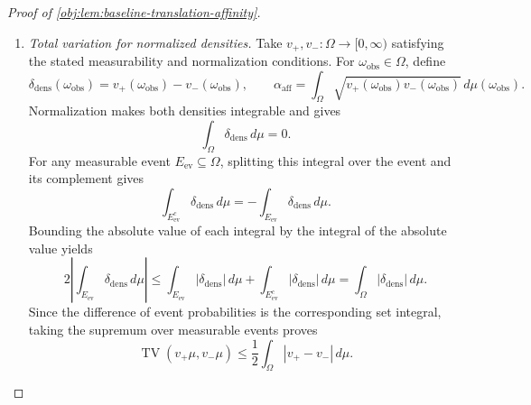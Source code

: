 \begin{proof}[Proof of \cref{obj:lem:baseline-translation-affinity}]
\begin{enumerate}
For completeness, the product-defect bound follows by induction over subsets
\(\mathcal J\subseteq\{1,\ldots,B\}\). Every such product lies in \([0,1]\), and the empty subset gives equality. For
\(\ell_0\in\{1,\ldots,B\}\setminus\mathcal J\), the induction step is
\[
\begin{aligned}
1-\alpha_{\mathrm{aff},\ell_0}
      \prod_{\ell\in\mathcal J}\alpha_{\mathrm{aff},\ell}
&=(1-\alpha_{\mathrm{aff},\ell_0})
  +\alpha_{\mathrm{aff},\ell_0}
     \left(1-\prod_{\ell\in\mathcal J}\alpha_{\mathrm{aff},\ell}\right)\\
&\le (1-\alpha_{\mathrm{aff},\ell_0})
     +1-\prod_{\ell\in\mathcal J}\alpha_{\mathrm{aff},\ell}\\
&\le (1-\alpha_{\mathrm{aff},\ell_0})
     +\sum_{\ell\in\mathcal J}(1-\alpha_{\mathrm{aff},\ell}).
\end{aligned}
\]
Consequently,
\[
\begin{aligned}
\int_{\mathbb R^B}
\left(\sqrt{v_{\boldsymbol s}(y)}
      -\sqrt{v_{\boldsymbol t}(y)}\right)^2\,dy
&\le\sum_{\ell=1}^B\mathcal E_{\mathrm{Hel},\ell}\\
&\le\sum_{\ell=1}^B4\pi^2(s_\ell-t_\ell)^2,
\end{aligned}
\]
where the last inequality is the scalar translation estimate. When \(B=0\), both product densities equal \(1\) on the one-point space \(\mathbb R^0\), and both sides of the bound are zero.

\item \emph{Total variation for normalized densities.}
Take \(v_+,v_-:\Omega\to[0,\infty)\) satisfying the stated measurability and normalization conditions. For \(\omega_{\mathrm{obs}}\in\Omega\), define
\[
\delta_{\mathrm{dens}}(\omega_{\mathrm{obs}})=v_+(\omega_{\mathrm{obs}})-v_-(\omega_{\mathrm{obs}}),
\qquad
\alpha_{\mathrm{aff}}
=\int_\Omega\sqrt{v_+(\omega_{\mathrm{obs}})v_-(\omega_{\mathrm{obs}})}\,d\mu(\omega_{\mathrm{obs}}).
\]
Normalization makes both densities integrable and gives
\[
\int_\Omega\delta_{\mathrm{dens}}\,d\mu=0.
\]
For any measurable event \(E_{\mathrm{ev}}\subseteq\Omega\), splitting this integral over the event and its complement gives
\[
\int_{E_{\mathrm{ev}}^c}\delta_{\mathrm{dens}}\,d\mu
=-\int_{E_{\mathrm{ev}}}\delta_{\mathrm{dens}}\,d\mu.
\]
Bounding the absolute value of each integral by the integral of the absolute value yields
\[
2\left|\int_{E_{\mathrm{ev}}}\delta_{\mathrm{dens}}\,d\mu\right|
\le
\int_{E_{\mathrm{ev}}}|\delta_{\mathrm{dens}}|\,d\mu
+\int_{E_{\mathrm{ev}}^c}|\delta_{\mathrm{dens}}|\,d\mu
=\int_\Omega|\delta_{\mathrm{dens}}|\,d\mu.
\]
Since the difference of event probabilities is the corresponding set integral, taking the supremum over measurable events proves
\[
\operatorname{TV}(v_+\mu,v_-\mu)
\le\frac12\int_\Omega|v_+-v_-|\,d\mu.
\]


\end{enumerate}
\end{proof}
